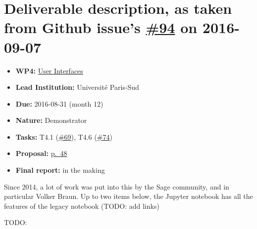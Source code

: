 \section*{\texorpdfstring{Deliverable description, as taken from Github
issue's
\href{https://github.com/OpenDreamKit/OpenDreamKit/issues/94}{\#94} on
2016-09-07}{Deliverable description, as taken from Github issue's \#94 on 2016-09-07}}\label{deliverable-description-as-taken-from-github-issues-94-on-2016-09-07}

\begin{itemize}
\tightlist
\item
  \textbf{WP4:}
  \href{https://github.com/OpenDreamKit/OpenDreamKit/tree/master/WP4}{User
  Interfaces}
\item
  \textbf{Lead Institution:} Université Paris-Sud
\item
  \textbf{Due:} 2016-08-31 (month 12)
\item
  \textbf{Nature:} Demonstrator
\item
  \textbf{Tasks:} T4.1
  (\href{https://github.com/OpenDreamKit/OpenDreamKit/issues/69}{\#69}),
  T4.6
  (\href{https://github.com/OpenDreamKit/OpenDreamKit/issues/74}{\#74})
\item
  \textbf{Proposal:}
  \href{https://github.com/OpenDreamKit/OpenDreamKit/raw/master/Proposal/proposal-www.pdf}{p.~48}
\item
  \textbf{Final report:} in the making
\end{itemize}

Since 2014, a lot of work was put into this by the Sage community, and
in particular Volker Braun. Up to two items below, the Jupyter notebook
has all the features of the legacy notebook (TODO: add links)

TODO:

